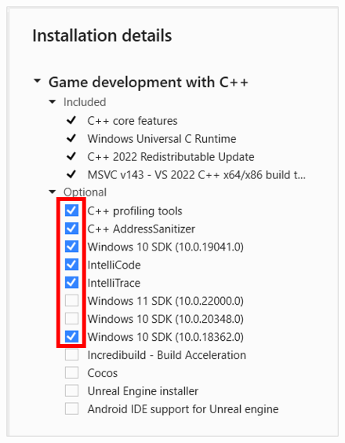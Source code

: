 {\begin{spacing}{1.5}
        \begin{figure}[H]
            \centering
            \includegraphics[scale=0.6]{Images/3/3.Intro.3.3} \hspace{5mm}

\end{figure}
\end{spacing}}
